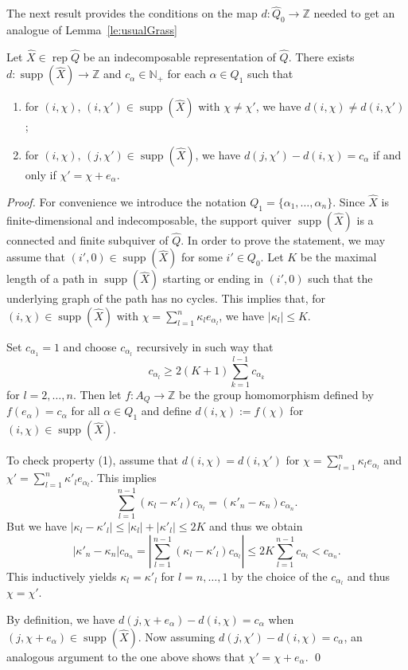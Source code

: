 \documentclass[smallextended,envcountsect,envcountsame]{svjour3}
\numberwithin{equation}{section}
\newcommand{\ZZ}{\mathbb{Z}}
\newcommand{\rep}{\operatorname{rep}}
\newcommand{\supp}{\operatorname{supp}}
\begin{document}
The next result provides the conditions on the map $d:\hat Q_0\to\ZZ$ needed to get an analogue of Lemma~\ref{le:usualGrass}
\begin{lemma}
  \label{le:degree condition} 
  Let $\hat X\in\rep\hat Q$ be an indecomposable representation of $\hat Q$.
  There exists $d:\supp(\hat X)\to\ZZ$ and $c_\alpha\in\mathbb N_+$ for each $\alpha\in Q_1$ such that
  \begin{enumerate}
    \item for $(i,\chi),\,(i,\chi')\in\supp(\hat X)$ with $\chi\neq\chi'$, we have $d(i,\chi)\ne d(i,\chi')$;
    \item for $(i,\chi),\,(j,\chi')\in\supp(\hat X)$, we have $d(j,\chi')-d(i,\chi)=c_\alpha$ if and only if $\chi'=\chi+e_\alpha$.
  \end{enumerate}
\end{lemma}
\begin{proof}
  For convenience we introduce the notation $Q_1=\{\alpha_1,\ldots,\alpha_n\}$.
  Since $\hat X$ is finite-dimensional and indecomposable, the support quiver $\supp(\hat X)$ is a connected and finite subquiver of $\hat Q$.
  In order to prove the statement, we may assume that $(i',0)\in\supp(\hat X)$ for some $i'\in Q_0$.
  Let $K$ be the maximal length of a path in $\supp(\hat X)$ starting or ending in $(i',0)$ such that the underlying graph of the path has no cycles.
  This implies that, for $(i,\chi)\in\supp(\hat X)$ with $\chi=\sum_{l=1}^n \kappa_l e_{\alpha_l}$, we have $|\kappa_l|\leq K$.

  Set $c_{\alpha_1}=1$ and choose $c_{\alpha_l}$ recursively in such way that 
  \[c_{\alpha_l}\geq 2(K+1)\sum_{k=1}^{l-1} c_{\alpha_k}\]
  for $l=2,\ldots,n$.  
  Then let $f:A_Q\to\ZZ$ be the group homomorphism defined by $f(e_\alpha)=c_\alpha$ for all $\alpha\in Q_1$ and define $d(i,\chi):=f(\chi)$ for $(i,\chi)\in\supp(\hat X)$.

  To check property (1), assume that $d(i,\chi)=d(i,\chi')$ for $\chi=\sum_{l=1}^n \kappa_l e_{\alpha_l}$ and $\chi'=\sum_{l=1}^n \kappa'_l e_{\alpha_l}$.
  This implies
  \[\sum_{l=1}^{n-1}(\kappa_l-\kappa'_l)c_{\alpha_l}=(\kappa'_n-\kappa_n)c_{\alpha_n}.\]
  But we have $|\kappa_l-\kappa'_l|\leq |\kappa_l|+|\kappa'_l|\le 2K$ and thus we obtain 
  \[|\kappa'_n-\kappa_n|c_{\alpha_n}=\left|\sum_{l=1}^{n-1}(\kappa_l-\kappa'_l)c_{\alpha_l}\right|\le 2K\sum_{l=1}^{n-1}c_{\alpha_l} < c_{\alpha_n}.\]
  This inductively yields $\kappa_l=\kappa'_l$ for $l=n,\ldots,1$ by the choice of the $c_{\alpha_l}$ and thus $\chi=\chi'$. 

  By definition, we have $d(j,\chi+e_\alpha)-d(i,\chi)=c_\alpha$ when $(j,\chi+e_\alpha)\in\supp(\hat X)$.
  Now assuming $d(j,\chi')-d(i,\chi)=c_\alpha$, an analogous argument to the one above shows that $\chi'=\chi+e_\alpha$.
\qed\end{proof}
\end{document}
